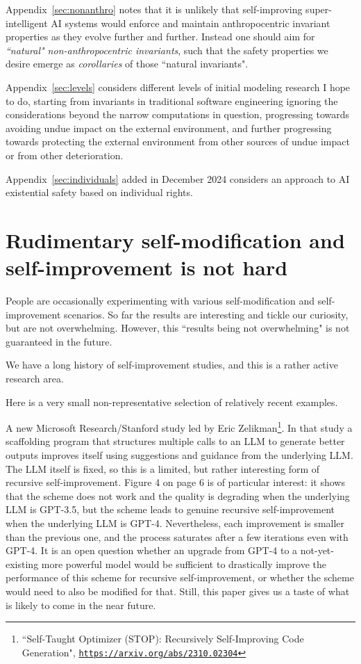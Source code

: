 \documentclass{article}
\begin{document}
Appendix~\ref{sec:nonanthro} notes that it is unlikely that self-improving super-intelligent AI systems would
enforce and maintain anthropocentric invariant properties as they evolve further and further. Instead one
should aim for {\em ``natural" non-anthropocentric invariants}, such that the safety properties we desire emerge as
{\em corollaries} of those ``natural invariants".

Appendix~\ref{sec:levels} considers different levels of initial modeling research I hope to do, starting from invariants in
traditional software engineering ignoring the considerations beyond the narrow computations in question,
progressing towards avoiding undue impact on the external environment, and further progressing towards
protecting the external environment from other sources of undue impact or from other deterioration.

Appendix~\ref{sec:individuals} added in December 2024 considers an approach to AI existential safety
based on individual rights.

\section{Rudimentary self-modification and self-improvement is not hard}\label{sec:selfmod}

People are occasionally experimenting with various self-modification and self-improvement scenarios.
So far the results are interesting and tickle our curiosity, but are not overwhelming. However, this 
``results being not overwhelming" is not guaranteed in the future.

We have a long history of self-improvement studies, and this is a rather active research area. 

Here is a very small non-representative selection of relatively recent examples.

A new Microsoft Research/Stanford study led by Eric Zelikman\footnote{``Self-Taught Optimizer (STOP): 
Recursively Self-Improving Code Generation", \href{https://arxiv.org/abs/2310.02304}{\tt https://arxiv.org/abs/2310.02304}}.
In that study a scaffolding program that structures multiple calls to an LLM to generate better outputs
improves itself using suggestions and guidance from the underlying LLM. The LLM itself is fixed, so this
is a limited, but rather interesting form of recursive self-improvement. Figure 4 on page 6 is of particular interest:
it shows that the scheme does not work and the quality is degrading when the underlying LLM is GPT-3.5, but
the scheme leads to genuine recursive self-improvement when the underlying LLM is GPT-4. Nevertheless,
each improvement is smaller than the previous one, and the process saturates after a few iterations even with GPT-4.
It is an open question whether an upgrade from GPT-4 to a not-yet-existing more powerful model would be
sufficient to drastically improve the performance of this scheme for recursive self-improvement, or whether the
scheme would need to also be modified for that. Still, this paper gives us a taste of what is likely to come in the near
future.
\end{document}
